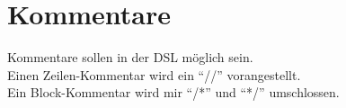 \section{Kommentare}
Kommentare sollen in der \ac{DSL} möglich sein.\\
Einen Zeilen-Kommentar wird ein ``//'' vorangestellt.\\
Ein Block-Kommentar wird mir ``/*'' und ``*/'' umschlossen.

\endinput
